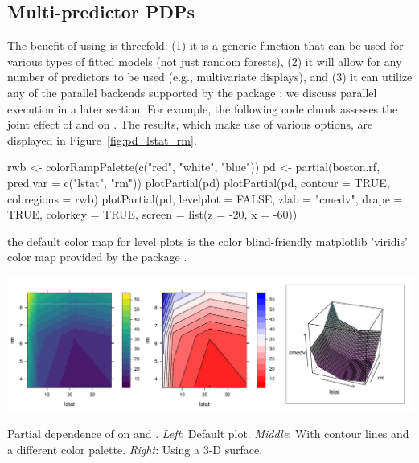 \subsection{Multi-predictor PDPs}

The benefit of using  is threefold: (1) it is a generic function that can be used for various types of fitted models (not just random forests), (2) it will allow for any number of predictors to be used (e.g., multivariate displays), and (3) it can utilize any of the parallel backends supported by the  package \citep{foreach-pkg}; we discuss parallel execution in a later section. For example, the following code chunk assesses the joint effect of  and  on . The results, which make use of various  options, are displayed in Figure~\ref{fig:pd_lstat_rm}.
\begin{example}
rwb <- colorRampPalette(c("red", "white", "blue"))
pd <- partial(boston.rf, pred.var = c("lstat", "rm"))
plotPartial(pd)
plotPartial(pd, contour = TRUE, col.regions = rwb)
plotPartial(pd, levelplot = FALSE, zlab = "cmedv", drape = TRUE,
            colorkey = TRUE, screen = list(z = -20, x = -60))
\end{example}
 the default color map for level plots is the color blind-friendly matplotlib \citep{hunter-matplotlib-2007} 'viridis' color map provided by the  package \citep{viridis-pkg}.

\begin{widefigure}[htbp]
  \centering
  \includegraphics[width=1.0\linewidth]{pd_lstat_rm}
  \caption{Partial dependence of  on  and . \textit{Left}: Default plot. \textit{Middle}: With contour lines and a different color palette. \textit{Right}: Using a 3-D surface.}
  \label{fig:pd_lstat_rm}
\end{widefigure}


